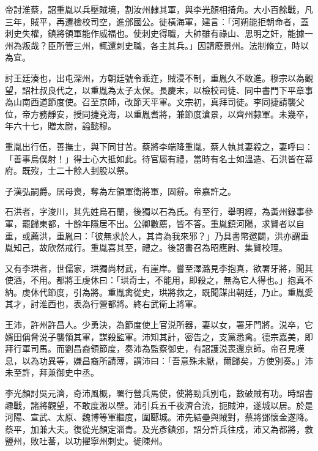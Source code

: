 \begin{pinyinscope}
 帝討淮蔡，詔重胤以兵壓賊境，割汝州隸其軍，與李光顏相掎角。大小百餘戰，凡三年，賊平，再遷檢校司空，進邠國公。徙橫海軍，建言：「河朔能拒朝命者，蓋刺史失權，鎮將領軍能作威福也。使刺史得職，大帥雖有祿山、思明之奸，能據一州為叛哉？臣所管三州，輒還刺史職，各主其兵。」因請廢景州。法制脩立，時以為宜。



 討王廷湊也，出屯深州，方朝廷號令乖迕，賊浸不制，重胤久不敢進。穆宗以為觀望，詔杜叔良代之，以重胤為太子太保。長慶末，以檢校司徒、同中書門下平章事為山南西道節度使。召至京師，改節天平軍。文宗初，真拜司徒。李同捷請襲父位，帝方務靜安，授同捷兗海，以重胤耆將，兼節度滄景，以齊州隸軍。未幾卒，年六十七，贈太尉，謚懿穆。



 重胤出行伍，善撫士，與下同甘苦。蔡將李端降重胤，蔡人執其妻殺之，妻呼曰：「善事烏僕射！」得士心大抵如此。待官屬有禮，當時有名士如溫造、石洪皆在幕府。既歿，士二十餘人刲股以祭。



 子漢弘嗣爵。居母喪，奪為左領軍衛將軍，固辭。帝嘉許之。



 石洪者，字浚川，其先姓烏石蘭，後獨以石為氏。有至行，舉明經，為黃州錄事參軍，罷歸東都，十餘年隱居不出。公卿數薦，皆不答。重胤鎮河陽，求賢者以自重，或薦洪，重胤曰：「彼無求於人，其肯為我來邪？」乃具書幣邀闢，洪亦謂重胤知己，故欣然戒行。重胤喜其至，禮之。後詔書召為昭應尉、集賢校理。



 又有李珙者，世儒家，珙獨尚材武，有崖岸。嘗至澤潞見李抱真，欲署牙將，聞其使酒，不用。都將王虔休曰：「珙奇士，不能用，即殺之，無為它人得也。」抱真不納。虔休代節度，引為將。重胤禽從史，珙將救之，既聞謀出朝廷，乃止。重胤愛其才，討淮西也，表為行營都將。終右武衛上將軍。



 王沛，許州許昌人。少勇決，為節度使上官涚所器，妻以女，署牙門將。涚卒，它婿田偁脅涚子襲領其軍，謀殺監軍。沛知其計，密告之，支黨悉禽。德宗嘉美，即拜行軍司馬。而劉昌裔領節度，奏沛為監察御史，有詔護涚喪還京師。帝召見嘆息，以為功異等，嫌昌裔所請薄，謂沛曰：「吾意殊未厭，爾歸矣，方使別奏。」沛未至許，拜兼御史中丞。



 李光顏討吳元濟，奇沛風概，署行營兵馬使，使將勁兵別屯，數破賊有功。時詔書趣戰，諸將觀望，不敢度溵以壁。沛引兵五千夜濟合流，扼賊沖，遂城以居。於是河陽、宣武、太原、魏博等軍繼度，圍郾城。沛先結壘與賊對，蔡將鄧懷金遂降。蔡平，加兼大夫。復從光顏定淄青。及光彥鎮邠，詔分許兵往戍，沛又為都將，救鹽州，敗吐蕃，以功擢寧州刺史。徙陳州。




\end{pinyinscope}
